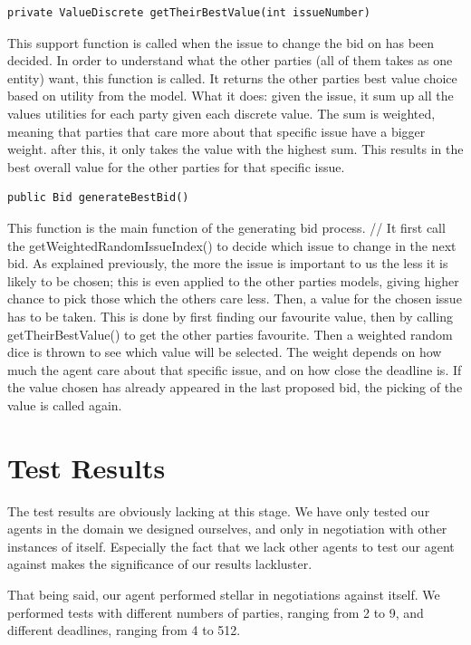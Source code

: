 \documentclass[a4,11pt]{scrartcl}
\begin{document}
\begin{lstlisting}
private ValueDiscrete getTheirBestValue(int issueNumber)
\end{lstlisting}
This support function is called when the issue to change the bid on has been decided. In order to understand what the other parties (all of them takes as one entity) want, this function is called. It returns the other parties best value choice based on utility from the model. What it does: given the issue, it sum up all the values utilities for each party given each discrete value. The sum is weighted, meaning that parties that care more about that specific issue have a bigger weight. after this, it only takes the value with the highest sum. This results in the best overall value for the other parties for that specific issue.  
\begin{lstlisting}
public Bid generateBestBid()
\end{lstlisting}
This function is the main function of the generating bid process. // It first call the getWeightedRandomIssueIndex() to decide which issue to change in the next bid. As explained previously, the more the issue is important to us the less it is likely to be chosen; this is even applied to the other parties models, giving higher chance to pick those which the others care less. 
Then, a value for the chosen issue has to be taken. This is done by first finding our favourite value, then by calling getTheirBestValue() to get the other parties favourite. Then a weighted random dice is thrown to see which value will be selected. The weight depends on how much the agent care about that specific issue, and on how close the deadline is. If the value chosen has already appeared in the last proposed bid, the picking of the value is called again.   



\section{Test Results}\label{results}
The test results are obviously lacking at this stage. We have only
tested our agents in the domain we designed ourselves, and only in
negotiation with other instances of itself. Especially the fact that we
lack other agents to test our agent against makes the significance of
our results lackluster.

That being said, our agent performed stellar in negotiations against 
itself. We performed tests with different numbers of parties, ranging
from 2 to 9, and different deadlines, ranging from 4 to 512.
\end{document}
